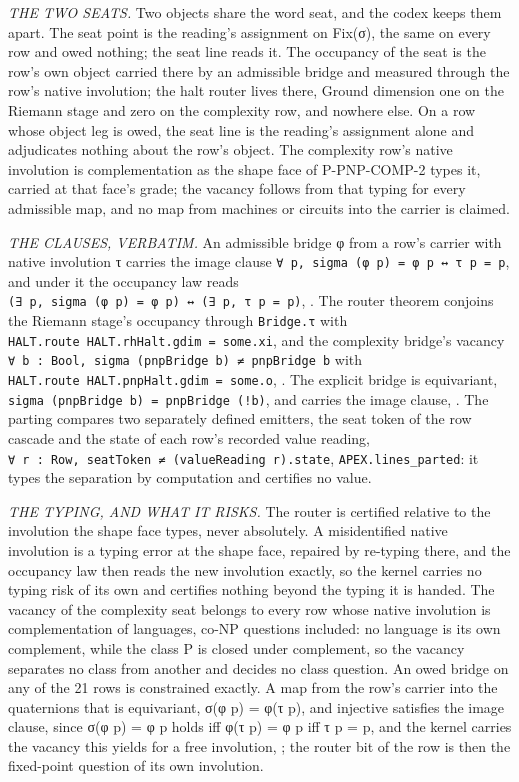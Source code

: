 \documentclass[10pt,twocolumn]{article}
\begin{document}
\emph{THE TWO SEATS.} Two objects share the word seat, and the codex
keeps them apart. The seat point is the reading's assignment on Fix(σ),
the same on every row and owed nothing; the seat line reads it. The
occupancy of the seat is the row's own object carried there by an
admissible bridge and measured through the row's native involution; the
halt router lives there, Ground dimension one on the Riemann stage and
zero on the complexity row, and nowhere else. On a row whose object leg
is owed, the seat line is the reading's assignment alone and adjudicates
nothing about the row's object. The complexity row's native involution
is complementation as the shape face of P-PNP-COMP-2 types it, carried
at that face's grade; the vacancy follows from that typing for every
admissible map, and no map from machines or circuits into the carrier is
claimed.

\emph{THE CLAUSES, VERBATIM.} An admissible bridge φ from a row's
carrier with native involution τ carries the image clause
\texttt{∀\ p,\ sigma\ (φ\ p)\ =\ φ\ p\ ↔\ τ\ p\ =\ p}, and under it the
occupancy law reads
\texttt{(∃\ p,\ sigma\ (φ\ p)\ =\ φ\ p)\ ↔\ (∃\ p,\ τ\ p\ =\ p)},
\texttt{}. The router
theorem conjoins the Riemann stage's occupancy through \texttt{Bridge.τ}
with \texttt{HALT.route\ HALT.rhHalt.gdim\ =\ some.xi}, and the
complexity bridge's vacancy
\texttt{∀\ b\ :\ Bool,\ sigma\ (pnpBridge\ b)\ ≠\ pnpBridge\ b} with
\texttt{HALT.route\ HALT.pnpHalt.gdim\ =\ some.o},
\texttt{}. The explicit bridge is
equivariant, \texttt{sigma\ (pnpBridge\ b)\ =\ pnpBridge\ (!b)}, and
carries the image clause,
\texttt{}. The parting compares
two separately defined emitters, the seat token of the row cascade and
the state of each row's recorded value reading,
\texttt{∀\ r\ :\ Row,\ seatToken\ ≠\ (valueReading\ r).state},
\texttt{APEX.lines\_parted}: it types the separation by computation and
certifies no value.

\emph{THE TYPING, AND WHAT IT RISKS.} The router is certified relative
to the involution the shape face types, never absolutely. A
misidentified native involution is a typing error at the shape face,
repaired by re-typing there, and the occupancy law then reads the new
involution exactly, so the kernel carries no typing risk of its own and
certifies nothing beyond the typing it is handed. The vacancy of the
complexity seat belongs to every row whose native involution is
complementation of languages, co-NP questions included: no language is
its own complement, while the class P is closed under complement, so the
vacancy separates no class from another and decides no class question.
An owed bridge on any of the 21 rows is constrained exactly. A map from
the row's carrier into the quaternions that is equivariant, σ(φ p) = φ(τ
p), and injective satisfies the image clause, since σ(φ p) = φ p holds
iff φ(τ p) = φ p iff τ p = p, and the kernel carries the vacancy this
yields for a free involution,
\texttt{}; the router bit
of the row is then the fixed-point question of its own involution.
\end{document}
